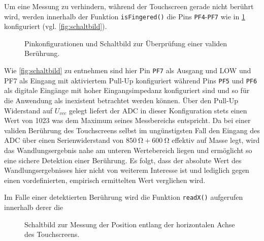 		Um eine Messung zu verhindern, während der Touchscreen gerade nicht berührt wird, werden innerhalb der Funktion \texttt{isFingered()} die Pins \texttt{PF4}-\texttt{PF7} wie in \cref{fig:fingered} konfiguriert (vgl. \cref{fig:schaltbild}).
		\begin{figure}[h]
			\centering
			
			\caption{Pinkonfigurationen und Schaltbild zur Überprüfung einer validen Berührung.}
			\label{fig:fingered}
		\end{figure}
		Wie \cref{fig:schaltbild} zu entnehmen sind hier Pin \texttt{PF7} als Ausgang und LOW und PF7 als Eingang mit aktiviertem Pull-Up konfiguriert während Pins \texttt{PF5} und \texttt{PF6} als digitale Eingänge mit hoher Eingangsimpedanz konfiguriert sind und so für die Anwendung als inexistent betrachtet werden können.
		Über den Pull-Up Widerstand auf \(U_{vcc}\) gelegt liefert der ADC in dieser Konfiguration stets einen Wert von 1023 was dem Maximum seines Messbereichs entspricht.
		Da bei einer validen Berührung des Touchscreens selbst im ungünstigsten Fall den Eingang des ADC über einen Serienwiderstand von \(\SI{850}{\ohm} + \SI{600}{\ohm}\) effektiv auf Masse legt, wird das Wandlungsergebnis nahe am unteren Wertebereich liegen und ermöglicht so eine sichere Detektion einer Berührung.
		Es folgt, dass der absolute Wert des Wandlungsergebnisses hier nicht von weiterem Interesse ist und lediglich gegen einen vordefinierten, empirisch ermittelten Wert verglichen wird.\par\medskip

		Im Falle einer detektierten Berührung wird die Funktion \texttt{readX()} aufgerufen innerhalb derer die
		\begin{figure}[h]
			\centering
			
			\caption{Schaltbild zur Messung der Position entlang der horizontalen Achse des Touchscreens.}
			\label{fig:readX schaltbild}
		\end{figure}